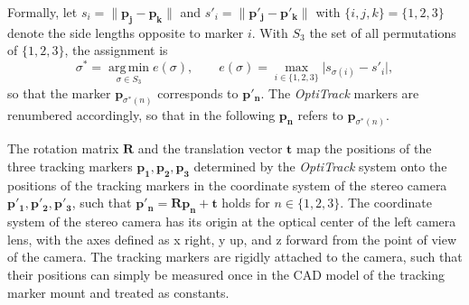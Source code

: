 \documentclass{siamart251216}
\begin{document}
Formally, let $s_i = \lVert \mathbf{p_j} - \mathbf{p_k} \rVert$ and $s'_i = \lVert \mathbf{p'_j} - \mathbf{p'_k} \rVert$ with $\{i, j, k\} = \{1, 2, 3\}$ denote the side lengths opposite to marker $i$.
With $S_3$ the set of all permutations of $\{1, 2, 3\}$, the assignment is
\[
  \sigma^* = \operatorname*{arg\,min}_{\sigma \in S_3} e(\sigma),
  \qquad
  e(\sigma) = \max_{i \in \{1, 2, 3\}} \lvert s_{\sigma(i)} - s'_i \rvert,
\]
so that the marker $\mathbf{p}_{\sigma^*(n)}$ corresponds to $\mathbf{p'_n}$.
The \emph{OptiTrack} markers are renumbered accordingly, so that in the following $\mathbf{p_n}$ refers to $\mathbf{p}_{\sigma^*(n)}$.

The rotation matrix $\mathbf{R}$ and the translation vector $\mathbf{t}$ map the positions of the three tracking markers $\mathbf{p_1}, \mathbf{p_2}, \mathbf{p_3}$ determined by the \emph{OptiTrack} system onto the positions of the tracking markers in the coordinate system of the stereo camera $\mathbf{p'_1}, \mathbf{p'_2}, \mathbf{p'_3}$, such that $\mathbf{p'_n} = \mathbf{R} \mathbf{p_n}+ \mathbf{t}$ holds for $n \in \{1, 2, 3\}$.
The coordinate system of the stereo camera has its origin at the optical center of the left camera lens, with the axes defined as x right, y up, and z forward from the point of view of the camera.
The tracking markers are rigidly attached to the camera, such that their positions can simply be measured once in the CAD model of the tracking marker mount and treated as constants.
\end{document}
